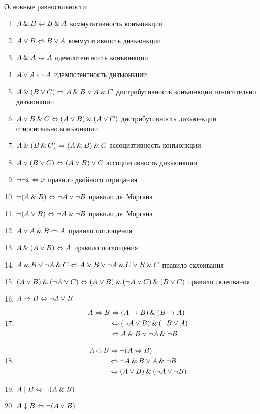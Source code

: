 \documentclass[main]{subfiles}
\begin{document}
Основные равносильности:
\begin{enumerate}
    \item $A\mathbin{\&} B \Leftrightarrow B\mathbin{\&} A$ коммутативность конъюнкции
    \item $A\lor B \Leftrightarrow B\lor A$ коммутативность дизъюнкции
    \item $A\mathbin{\&} A \Leftrightarrow A$ идемпотентность конъюнкции
    \item $A\lor A \Leftrightarrow  A$ идемпотентность дизъюнкции
    \item $A\mathbin{\&}(B\lor C) \Leftrightarrow  A\mathbin{\&} B \lor A\mathbin{\&} C$ дистрибутивность конъюнкции относительно дизъюнкции
    \item $A\lor B\mathbin{\&} C  \Leftrightarrow (A\lor B)\mathbin{\&} (A\lor C)$ дистрибутивность дизъюнкции относительно конъюнкции
    \item $A\mathbin{\&} (B\mathbin{\&} C) \Leftrightarrow (A\mathbin{\&} B)\mathbin{\&} C$ ассоциативность конъюнкции
    \item $A\lor (B\lor C) \Leftrightarrow  (A\lor B)\lor C$ ассоциативность дизъюнкции
    \item $\lnot\lnot x \Leftrightarrow x$ правило двойного отрицания
    \item $\lnot(A\mathbin{\&} B) \Leftrightarrow \lnot A \lor \lnot B$ правило де~Моргана
    \item $\lnot(A\lor B) \Leftrightarrow  \lnot A \mathbin{\&} \lnot B$ правило де~Моргана
    \item $A\lor A \mathbin{\&} B \Leftrightarrow  A$ правило поглощения
    \item $A\mathbin{\&}(A\lor B) \Leftrightarrow  A$ правило поглощения
    \item $A\mathbin{\&} B \lor \lnot A\mathbin{\&} C \Leftrightarrow  A\mathbin{\&} B \lor \lnot A \mathbin{\&} C \lor B\mathbin{\&} C $ правило склеивания
    \item $(A\lor B) \mathbin{\&} (\lnot A \lor C) \Leftrightarrow  (A\lor B) \mathbin{\&} (\lnot A \lor C) \mathbin{\&} (B\lor C)$ правило склеивания
    \item $A\to B \Leftrightarrow \lnot A \lor B$
    \item
          \begin{align*}
              A\Leftrightarrow B & \Leftrightarrow (A\to B) \mathbin{\&} (B\to A)                \\
                      & \Leftrightarrow (\lnot A\lor B) \mathbin{\&} (\lnot B \lor A) \\
                      & \Leftrightarrow A\mathbin{\&} B \lor \lnot A \mathbin{\&} \lnot B
          \end{align*}
    \item
          \begin{align*}
              A\oplus B & \Leftrightarrow \lnot(A \Leftrightarrow B)                       \\
                        & \Leftrightarrow \lnot A\mathbin{\&} B \lor A \mathbin{\&} \lnot B     \\
                        & \Leftrightarrow (A\lor B) \mathbin{\&} (\lnot A \lor \lnot B)
          \end{align*}
    \item $A \mid B \Leftrightarrow  \lnot(A \mathbin{\&} B)$
    \item $A \downarrow B \Leftrightarrow \lnot (A\lor B)$
\end{enumerate}
\end{document}
